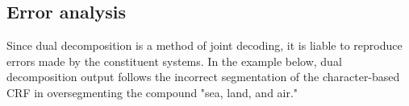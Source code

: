 %
%
%
%
%
%

\subsection{Error analysis}

Since dual decomposition is a method of joint decoding, it is liable to reproduce errors made by the constituent systems. In the example below, dual decomposition output follows the incorrect segmentation of the character-based CRF in oversegmenting the compound "sea, land, and air." 

